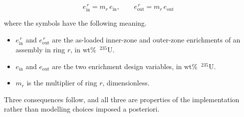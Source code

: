 \begin{equation}
e_\mathrm{in}^{\,r} = m_r \, e_\mathrm{in},
\qquad
e_\mathrm{out}^{\,r} = m_r \, e_\mathrm{out}
\label{eq:zoning-pair}
\end{equation}

\noindent where the symbols have the following meaning.

\begin{itemize}
  \item $e_\mathrm{in}^{\,r}$ and $e_\mathrm{out}^{\,r}$ are the
        as-loaded inner-zone and outer-zone enrichments of an assembly
        in ring $r$, in wt\%~$^{235}$U.

  \item $e_\mathrm{in}$ and $e_\mathrm{out}$ are the two enrichment
        design variables, in wt\%~$^{235}$U.

  \item $m_r$ is the multiplier of ring $r$, dimensionless.
\end{itemize}

Three consequences follow, and all three are properties of the
implementation rather than modelling choices imposed a posteriori.

